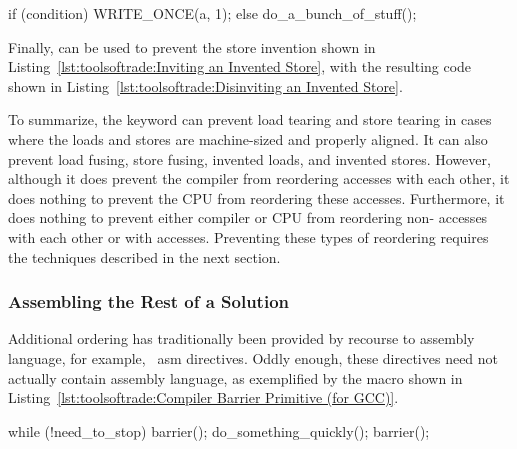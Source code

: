 \begin{listing}[tbp]
\begin{fcvlabel}
\begin{VerbatimL}[commandchars=\\\{\}]
if (condition)
	WRITE_ONCE(a, 1);
else
	do_a_bunch_of_stuff();
\end{VerbatimL}
\end{fcvlabel}
\caption{Disinviting an Invented Store}
\label{lst:toolsoftrade:Disinviting an Invented Store}
\end{listing}

Finally,  can be used to prevent the store invention
shown in
Listing~\ref{lst:toolsoftrade:Inviting an Invented Store},
with the resulting code shown in
Listing~\ref{lst:toolsoftrade:Disinviting an Invented Store}.

To summarize, the  keyword can prevent load
tearing and store tearing in cases where the loads and stores are
machine-sized and properly aligned.
It can also prevent load fusing, store fusing, invented loads, and
invented stores.
However, although it does prevent the compiler from reordering 
accesses with each other, it does nothing to prevent the
CPU from reordering these accesses.
Furthermore, it does nothing to prevent either compiler or CPU from
reordering non- accesses with each other or with
 accesses.
Preventing these types of reordering requires the techniques described
in the next section.

\subsubsection{Assembling the Rest of a Solution}
\label{sec:toolsoftrade:Assembling the Rest of a Solution}

Additional ordering has traditionally been provided by recourse to
assembly language, for example, \GCC\ asm directives.
Oddly enough, these directives need not actually contain assembly language,
as exemplified by the  macro shown in
Listing~\ref{lst:toolsoftrade:Compiler Barrier Primitive (for GCC)}.

\begin{listing}[tbp]
\begin{fcvlabel}
\begin{VerbatimL}[commandchars=\\\[\]]
while (!need_to_stop) {
	barrier(); \lnlbl[b1]
	do_something_quickly();
	barrier(); \lnlbl[b2]
}
\end{VerbatimL}
\end{fcvlabel}
\caption{Preventing C Compilers From Fusing Loads}
\label{lst:toolsoftrade:Preventing C Compilers From Fusing Loads}
\end{listing}

